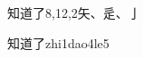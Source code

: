 \begin{entry}{知道了}{8,12,2}{⽮、⾡、⼅}
  \begin{phonetics}{知道了}{zhi1dao4le5}
  \end{phonetics}
\end{entry}
